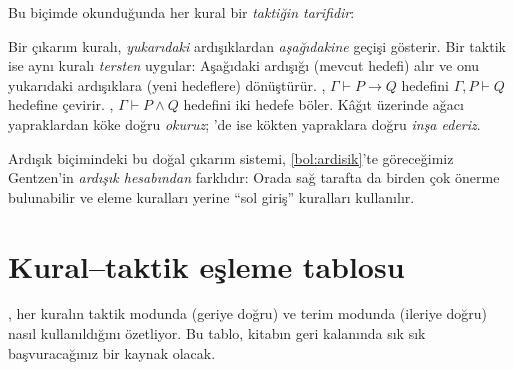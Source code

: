 \noindent Bu biçimde okunduğunda her kural bir \emph{taktiğin tarifidir}:

\begin{onemlifikir}[Önemli Fikir: Taktik = kuralı aşağıdan yukarı uygulamak]
Bir çıkarım kuralı, \emph{yukarıdaki} ardışıklardan \emph{aşağıdakine}
geçişi gösterir. Bir taktik ise aynı kuralı \emph{tersten} uygular:
Aşağıdaki ardışığı (mevcut hedefi) alır ve onu yukarıdaki ardışıklara
(yeni hedeflere) dönüştürür. , $\Gamma \vdash P \to Q$
hedefini $\Gamma, P \vdash Q$ hedefine çevirir. ,
$\Gamma \vdash P \wedge Q$ hedefini iki hedefe böler. Kâğıt üzerinde ağacı
yapraklardan köke doğru \emph{okuruz}; \Lean{}'de ise kökten yapraklara
doğru \emph{inşa ederiz}.
\end{onemlifikir}


\noindent Ardışık biçimindeki bu doğal çıkarım sistemi, \cref{bol:ardisik}'te
göreceğimiz Gentzen'in \emph{ardışık hesabından} farklıdır: Orada sağ
tarafta da birden çok önerme bulunabilir ve eleme kuralları yerine
``sol giriş'' kuralları kullanılır.

\section{Kural--taktik eşleme tablosu}\label{sec:kural-taktik}

, her kuralın taktik modunda (geriye doğru) ve
terim modunda (ileriye doğru) nasıl kullanıldığını özetliyor. Bu tablo,
kitabın geri kalanında sık sık başvuracağınız bir kaynak olacak.

